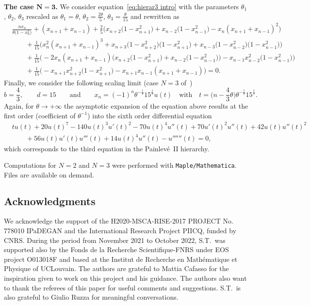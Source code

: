 \documentclass[pdftex]{sigma}%
\numberwithin{equation}{section}
\begin{document}
{\bf The case $\boldsymbol{N=3}$.}
We consider equation~\eqref{eq:hierar3 intro} with the parameters $\theta_1$, $\theta_2$, $\theta_3$ rescaled as
$\theta_1=\theta$, $\theta_2 = \frac{2\theta}{5}$, $\theta_3=\frac{\theta}{15}$ and rewritten as
\begin{align*}
&\frac{n x_n}{\theta\big(1-x_n^2\big)}+(x_{n+1}+x_{n-1}) +\frac{2}{5}\big(x_{n+2}\big(1-x_{n+1}^2\big)+x_{n-2}\big(1-x_{n-1}^2\big)-x_n(x_{n+1}+x_{n-1})^2\big)
\\	
&\qquad +\frac{1}{15}\big(x_n^2(x_{n+1}+x_{n-1})^3+x_{n+3}\big(1-x_{n+2}^2\big)\big(1-x_{n+1}^2\big) +x_{n-3}\big(1-x_{n-2}^2\big)\big(1-x_{n-1}^2\big)\big)
\\
&\qquad +\frac{1}{15}\bigl(-2x_n(x_{n+1}+x_{n-1})\big(x_{n+2}\big(1\!-x_{n+1}^2\big)\!+x_{n-2}\big(1\!-x_{n-1}^2\big)\big) -x_{n-1}x_{n-2}^2\big(1\!-x_{n-1}^2\big)\bigr)
\\
&\qquad+\frac{1}{15}\bigl(-x_{n+1}x_{n+2}^2\big(1-x_{n+1}^2\big)-x_{n+1}x_{n-1}(x_{n+1}+x_{n-1})\bigr)=0.
\end{align*}
Finally, we consider the following scaling limit (case $N=3$ of~\cite[Theorem~1]{betea2021multicritical})
\begin{equation*}
b=\frac{4}{3},\qquad
d=15\qquad\text{and}\qquad
x_n=(-1)^n\theta^{-\frac{1}{7}}15^{\frac{1}{7}}u(t) \quad\text{with}\quad t=\bigg(n-\frac{4}{3}\theta\bigg)\theta^{-\frac{1}{7}}15^{\frac{1}{7}}.
\end{equation*}
Again, for $\theta\rightarrow +\infty$ the asymptotic expansion of the equation above results at the first order (coefficient of $\theta^{-1}$) into the sixth order differential equation
\begin{align*}
&	tu(t)+20u(t)^7 -140u(t)^3u'(t)^2-70u(t)^4u''(t)+70u'(t)^2u''(t)+42 u(t)u''(t)^2
\\
& \qquad{}
+56u(t)u'(t)u'''(t)+14u(t)^4u''(t)-u''''''(t)=0,
\end{align*}
which corresponds to the third equation in the Painlev\'e~II hierarchy.
\begin{Remark}
	Computations for $N=2$ and $N=3$ were performed with \texttt{Maple/Mathematica}. Files are available on demand.
\end{Remark}


\subsection*{Acknowledgments} We acknowledge the support of the H2020-MSCA-RISE-2017 PROJECT No. 778010 IPaDEGAN and the International Research Project PIICQ, funded by CNRS. During the period from November 2021 to October 2022, S.T.\ was supported also by the Fonds de la Recherche Scientifique-FNRS under EOS project O013018F and based at the Institut de Recherche en Math\'ematique et Physique of UCLouvain. The authors are grateful to Mattia Cafasso for the inspiration given to work on this project and his guidance. The authors also want to thank the referees of this paper for useful comments and suggestions. S.T.\ is also grateful to Giulio Ruzza for meaningful conversations.
\end{document}
